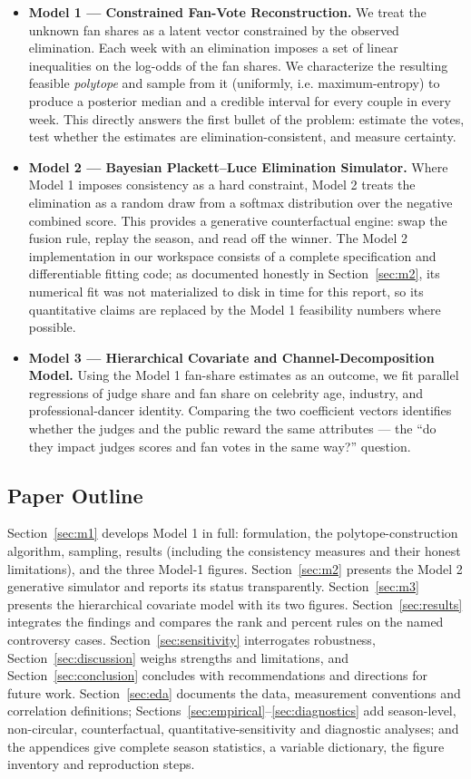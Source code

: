 \documentclass{article}
\begin{document}
\begin{itemize}
\item \textbf{Model 1 --- Constrained Fan-Vote Reconstruction.} We treat the unknown fan
shares as a latent vector constrained by the observed elimination. Each week with an
elimination imposes a set of linear inequalities on the log-odds of the fan shares. We
characterize the resulting feasible \emph{polytope} and sample from it (uniformly, i.e.
maximum-entropy) to produce a posterior median and a credible interval for every couple
in every week. This directly answers the first bullet of the problem: estimate the votes,
test whether the estimates are elimination-consistent, and measure certainty.
\item \textbf{Model 2 --- Bayesian Plackett--Luce Elimination Simulator.} Where Model 1
imposes consistency as a hard constraint, Model 2 treats the elimination as a random draw
from a softmax distribution over the negative combined score. This provides a
generative counterfactual engine: swap the fusion rule, replay the season, and read off
the winner. The Model 2 implementation in our workspace consists of a complete
specification and differentiable fitting code; as documented honestly in
Section~\ref{sec:m2}, its numerical fit was not materialized to disk in time for this
report, so its quantitative claims are replaced by the Model 1 feasibility numbers where
possible.
\item \textbf{Model 3 --- Hierarchical Covariate and Channel-Decomposition Model.} Using
the Model 1 fan-share estimates as an outcome, we fit parallel regressions of judge share
and fan share on celebrity age, industry, and professional-dancer identity. Comparing the
two coefficient vectors identifies whether the judges and the public reward the same
attributes --- the ``do they impact judges scores and fan votes in the same way?'' question.
\end{itemize}

\subsection{Paper Outline}

Section~\ref{sec:m1} develops Model 1 in full: formulation, the polytope-construction
algorithm, sampling, results (including the consistency measures and their honest
limitations), and the three Model-1 figures. Section~\ref{sec:m2} presents the Model 2
generative simulator and reports its status transparently. Section~\ref{sec:m3} presents
the hierarchical covariate model with its two figures. Section~\ref{sec:results} integrates
the findings and compares the rank and percent rules on the named controversy cases.
Section~\ref{sec:sensitivity} interrogates robustness, Section~\ref{sec:discussion} weighs
strengths and limitations, and Section~\ref{sec:conclusion} concludes with recommendations
and directions for future work. Section~\ref{sec:eda} documents the data, measurement
conventions and correlation definitions; Sections~\ref{sec:empirical}--\ref{sec:diagnostics}
add season-level, non-circular, counterfactual, quantitative-sensitivity and diagnostic
analyses; and the appendices give complete season statistics, a variable dictionary, the
figure inventory and reproduction steps.
\end{document}
